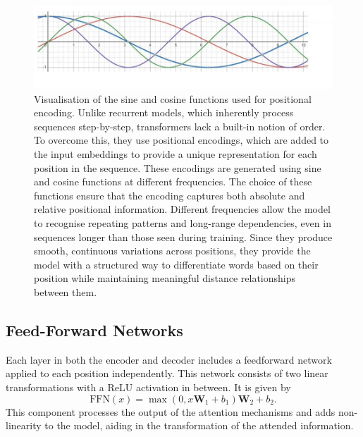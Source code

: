 \begin{figure}[htbp]
  \centering
  \includegraphics[width=\textwidth]{../sections/transformer-architecture/attachments/positional-encoding.png}
  \caption{Visualisation of the sine and cosine functions used for positional encoding. Unlike recurrent models, which inherently process sequences step-by-step, transformers lack a built-in notion of order. To overcome this, they use positional encodings, which are added to the input embeddings to provide a unique representation for each position in the sequence. These encodings are generated using sine and cosine functions at different frequencies. The choice of these functions ensure that the encoding captures both absolute and relative positional information. Different frequencies allow the model to recognise repeating patterns and long-range dependencies, even in sequences longer than those seen during training. Since they produce smooth, continuous variations across positions, they provide the model with a structured way to differentiate words based on their position while maintaining meaningful distance relationships between them.}\label{fig:positional-encoding}
\end{figure}

\subsection{Feed-Forward Networks}

Each layer in both the encoder and decoder includes a feedforward network applied to each position independently. This network consists of two linear transformations with a ReLU activation in between. It is given by
\begin{equation}
  \text{FFN}(x)=\max(0,x\mathbf{W}_1+b_1)\mathbf{W}_2+b_2.
\end{equation}\label{eq:feed-forward}
This component processes the output of the attention mechanisms and adds non-linearity to the model, aiding in the transformation of the attended information.
